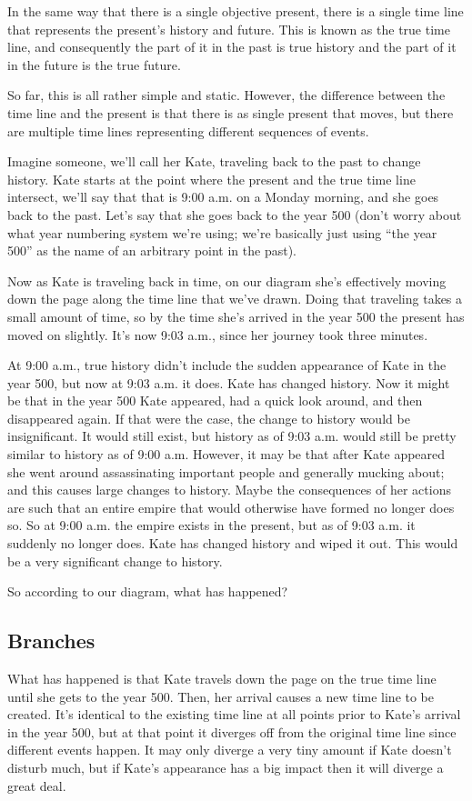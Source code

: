 \begin{multicols*}{2}
In the same way that there is a single objective present, there is a single time line that represents the present’s history and future. This is known as the true time line, and consequently the part of it in the past is true history and the part of it in the future is the true future.

So far, this is all rather simple and static. However, the difference between the time line and the present is that there is as single present that moves, but there are multiple time lines representing different sequences of events.

Imagine someone, we’ll call her Kate, traveling back to the past to change history. Kate starts at the point where the present and the true time line intersect, we’ll say that that is 9:00 a.m. on a Monday morning, and she goes back to the past. Let’s say that she goes back to the year 500 (don’t worry about what year numbering system we’re using; we’re basically just using “the year 500” as the name of an arbitrary point in the past).

Now as Kate is traveling back in time, on our diagram she’s effectively moving down the page along the time line that we’ve drawn. Doing that traveling takes a small amount of time, so by the time she’s arrived in the year 500 the present has moved on slightly. It’s now 9:03 a.m., since her journey took three minutes. 

At 9:00 a.m., true history didn’t include the sudden appearance of Kate in the year 500, but now at 9:03 a.m. it does. Kate has changed history. Now it might be that in the year 500 Kate appeared, had a quick look around, and then disappeared again. If that were the case, the change to history would be insignificant. It would still exist, but history as of 9:03 a.m. would still be pretty similar to history as of 9:00 a.m. However, it may be that after Kate appeared she went around assassinating important people and generally mucking about; and this causes large changes to history. Maybe the consequences of her actions are such that an entire empire that would otherwise have formed no longer does so. So at 9:00 a.m. the empire exists in the present, but as of 9:03 a.m. it suddenly no longer does. Kate has changed history and wiped it out. This would be a very significant change to history.

So according to our diagram, what has happened?

\subsection{Branches}
What has happened is that Kate travels down the page on the true time line until she gets to the year 500. Then, her arrival causes a new time line to be created. It’s identical to the existing time line at all points prior to Kate’s arrival in the year 500, but at that point it diverges off from the original time line since different events happen. It may only diverge a very tiny amount if Kate doesn’t disturb much, but if Kate’s appearance has a big impact then it will diverge a great deal.


\end{multicols*}

